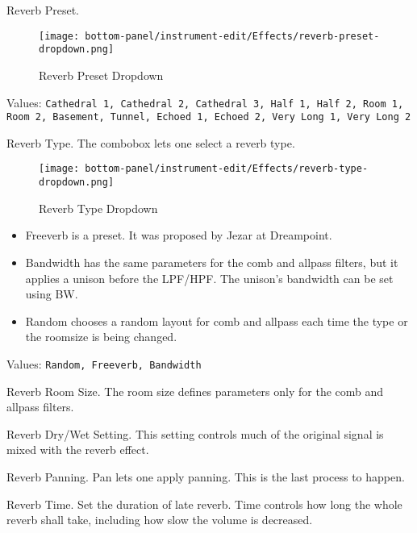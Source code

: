       Reverb Preset.

\begin{figure}[H]
   \centering
   \texttt{[image: bottom-panel/instrument-edit/Effects/reverb-preset-dropdown.png]}
   \caption{Reverb Preset Dropdown}
   \label{fig:reverb_preset_dropdown}
\end{figure}

   Values: \texttt{Cathedral 1, Cathedral 2, Cathedral 3, Half 1, Half 2,
              Room 1, Room 2, Basement, Tunnel, Echoed 1, Echoed 2, Very Long
               1, Very Long 2}

   Reverb Type.
   The combobox lets one select a reverb type.

\begin{figure}[H]
   \centering
   \texttt{[image: bottom-panel/instrument-edit/Effects/reverb-type-dropdown.png]}
   \caption{Reverb Type Dropdown}
   \label{fig:reverb_type_dropdown}
\end{figure}

   \begin{itemize}
      \item Freeverb is a preset. It was proposed by Jezar at Dreampoint.
      \item Bandwidth has the same parameters for the comb and allpass
         filters, but it applies a unison before the LPF/HPF. The unison’s
         bandwidth can be set using BW.
      \item Random chooses a random layout for comb and allpass each time the
         type or the roomsize is being changed.
   \end{itemize}

   Values: \texttt{Random, Freeverb, Bandwidth}

   Reverb Room Size.
   The room size defines parameters only for the comb and allpass filters.

   Reverb Dry/Wet Setting.
   This setting controls much of the original signal is mixed with the
   reverb effect.

   Reverb Panning.
   Pan lets one apply panning. This is the last process to happen.

   Reverb Time.
   Set the duration of late reverb.
   Time controls how long the whole reverb shall take, including how slow
   the volume is decreased.

